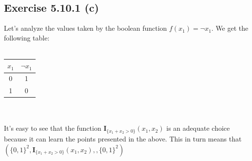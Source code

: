 \documentclass{exam}
\begin{document}
\subsection*{Exercise 5.10.1 (c)}                                                                                             
Let's analyze the values taken by the boolean function $f(x_1) = \neg x_{1}$. We get the following table:\\   
\\                                                                                                                            
\begin{tabular}{|c c|}                                                                                                    
    \hline                                                                                                                    
    $x_1$ & $\neg x_{1}$ \\ [0.5ex]                                                            
    \hline                                                                                                                    
    0  & 1 \\                                                                                             
    \hline                                                                                                                    
    1  & 0 \\
    \hline
\end{tabular}\\                                                                                                               
\\                                                                                                                            
It's easy to see that the function $\mathbf{I}_{\{x_1 + x_2 > 0\}}(x_1, x_2)$ is an adequate choice because it can learn the  
points presented in the above. This in turn means that $(\{0,1\}^{2},\mathbf{I}_{\{x_1 + x_2 > 0\}}(x_1, x_2), ,\{0,1\}^{2})$
\end{document}
